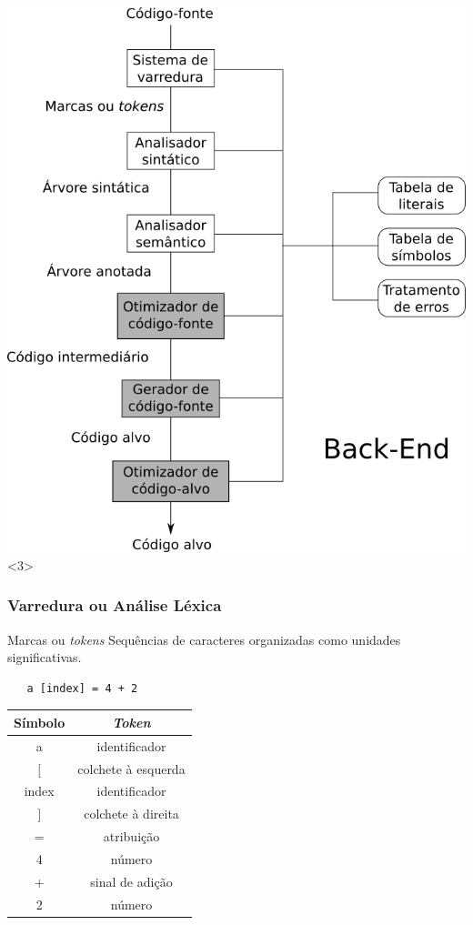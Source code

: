 \documentclass[table]{beamer}
\begin{document}
\begin{frame}
   \includegraphics[scale=0.35]{figuras/etapasbackend.png}<3>
\end{frame}

\begin{frame}[fragile]
   \frametitle{Varredura ou Análise Léxica}
   \begin{block}{Marcas ou \textit{tokens}}
   Sequências de caracteres organizadas como unidades significativas.
   \end{block}
   \begin{verbatim}
   a [index] = 4 + 2     
   \end{verbatim}
   \begin{table}
      \begin{tabular}{c|c}
      Símbolo & \textit{Token} \\
      \hline 
      a     & identificador \\
      $[$   & colchete à esquerda \\
      index & identificador \\
      $]$   & colchete à direita \\
      =     & atribuição \\
      4     & número \\
      +     & sinal de adição \\
      2     &  número \\
      \end{tabular}
   \end{table}
\end{frame}
\end{document}
